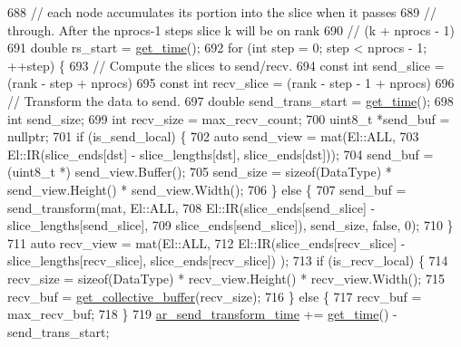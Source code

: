 \begin{DoxyCode}
688   \textcolor{comment}{// each node accumulates its portion into the slice when it passes}
689   \textcolor{comment}{// through. After the nprocs-1 steps slice k will be on rank}
690   \textcolor{comment}{// (k + nprocs - 1) %
691   \textcolor{keywordtype}{double} rs\_start = \hyperlink{namespacelbann_a478d36031ff0659893c4322cd856157f}{get\_time}();
692   \textcolor{keywordflow}{for} (\textcolor{keywordtype}{int} step = 0; step < nprocs - 1; ++step) \{
693     \textcolor{comment}{// Compute the slices to send/recv.}
694     \textcolor{keyword}{const} \textcolor{keywordtype}{int} send\_slice = (rank - step + nprocs) %
695     \textcolor{keyword}{const} \textcolor{keywordtype}{int} recv\_slice = (rank - step - 1 + nprocs) %
696     \textcolor{comment}{// Transform the data to send.}
697     \textcolor{keywordtype}{double} send\_trans\_start = \hyperlink{namespacelbann_a478d36031ff0659893c4322cd856157f}{get\_time}();
698     \textcolor{keywordtype}{int} send\_size;
699     \textcolor{keywordtype}{int} recv\_size = max\_recv\_count;
700     uint8\_t *send\_buf = \textcolor{keyword}{nullptr};
701     \textcolor{keywordflow}{if} (is\_send\_local) \{
702       \textcolor{keyword}{auto} send\_view = mat(El::ALL,
703                            El::IR(slice\_ends[dst] - slice\_lengths[dst], slice\_ends[dst]));
704       send\_buf = (uint8\_t *) send\_view.Buffer();
705       send\_size = \textcolor{keyword}{sizeof}(DataType) * send\_view.Height() * send\_view.Width();
706     \} \textcolor{keywordflow}{else} \{
707       send\_buf = send\_transform(mat, El::ALL,
708                                      El::IR(slice\_ends[send\_slice] - slice\_lengths[send\_slice],
709                                             slice\_ends[send\_slice]), send\_size, \textcolor{keyword}{false}, 0);
710     \}
711     \textcolor{keyword}{auto} recv\_view = mat(El::ALL,
712                          El::IR(slice\_ends[recv\_slice] - slice\_lengths[recv\_slice], slice\_ends[recv\_slice])
      );
713     \textcolor{keywordflow}{if} (is\_recv\_local) \{
714       recv\_size = \textcolor{keyword}{sizeof}(DataType) * recv\_view.Height() * recv\_view.Width();
715       recv\_buf = \hyperlink{classlbann_1_1lbann__comm_ae925ac5eaf2895717c709b252961b3bf}{get\_collective\_buffer}(recv\_size);
716     \} \textcolor{keywordflow}{else} \{
717       recv\_buf = max\_recv\_buf;
718     \}
719     \hyperlink{classlbann_1_1lbann__comm_a4e3d35520a8f567579f9235e9808ba1c}{ar\_send\_transform\_time} += \hyperlink{namespacelbann_a478d36031ff0659893c4322cd856157f}{get\_time}() - send\_trans\_start;
}
\end{DoxyCode}
